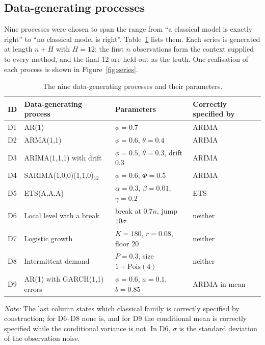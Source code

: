 \documentclass[11pt]{article}
\providecommand{\tableref}[1]{Table~\ref{#1}}
\providecommand{\figureref}[1]{Figure~\ref{#1}}
\begin{document}
\subsection{Data-generating processes}
\label{sec:dgps}

Nine processes were chosen to span the range from ``a classical model is exactly right'' to
``no classical model is right''. \tableref{tab:dgps} lists them. Each series is generated at
length $n + H$ with $H = 12$; the first $n$ observations form the context supplied to every
method, and the final 12 are held out as the truth. One realisation of each process is shown
in \figureref{fig:series}.

\begin{table}[!htbp]
\centering
\begin{threeparttable}
\caption{The nine data-generating processes and their parameters.}
\label{tab:dgps}
\small\setlength{\tabcolsep}{4pt}
\begin{tabular}{llll}
\toprule
ID & Data-generating process & Parameters & Correctly specified by \\
\midrule
D1 & AR(1)                        & $\phi = 0.7$                                & ARIMA \\
D2 & ARMA(1,1)                    & $\phi = 0.6$, $\theta = 0.4$                & ARIMA \\
D3 & ARIMA(1,1,1) with drift      & $\phi = 0.5$, $\theta = 0.3$, drift $0.3$   & ARIMA \\
D4 & SARIMA(1,0,0)(1,1,0)$_{12}$  & $\phi = 0.6$, $\Phi = 0.5$                  & ARIMA \\
D5 & ETS(A,A,A)                   & $\alpha = 0.3$, $\beta = 0.01$, $\gamma = 0.2$ & ETS \\
D6 & Local level with a break     & break at $0.7n$, jump $10\sigma$            & neither \\
D7 & Logistic growth              & $K = 180$, $r = 0.08$, floor $20$           & neither \\
D8 & Intermittent demand          & $P = 0.3$, size $1 + \mathrm{Pois}(4)$      & neither \\
D9 & AR(1) with GARCH(1,1) errors & $\phi = 0.6$, $a = 0.1$, $b = 0.85$         & ARIMA in mean \\
\bottomrule
\end{tabular}
\begin{tablenotes}[flushleft]\footnotesize
\item \textit{Note:} The last column states which classical family is correctly specified by
construction; for D6--D8 none is, and for D9 the conditional mean is correctly specified while
the conditional variance is not. In D6, $\sigma$ is the standard deviation of the observation
noise.
\end{tablenotes}
\end{threeparttable}
\end{table}
\end{document}
